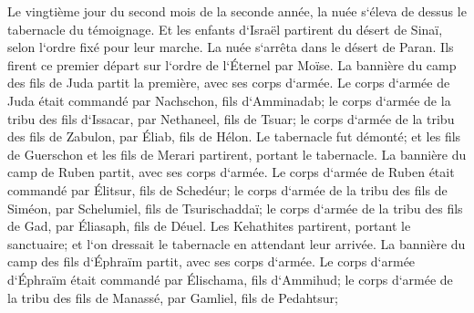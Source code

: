 \verse Le vingtième jour du second mois de la seconde année, la nuée s`éleva de dessus le tabernacle du témoignage. 
\verse Et les enfants d`Israël partirent du désert de Sinaï, selon l`ordre fixé pour leur marche. La nuée s`arrêta dans le désert de Paran. 
\verse Ils firent ce premier départ sur l`ordre de l`Éternel par Moïse. 
\verse La bannière du camp des fils de Juda partit la première, avec ses corps d`armée. Le corps d`armée de Juda était commandé par Nachschon, fils d`Amminadab; 
\verse le corps d`armée de la tribu des fils d`Issacar, par Nethaneel, fils de Tsuar; 
\verse le corps d`armée de la tribu des fils de Zabulon, par Éliab, fils de Hélon. 
\verse Le tabernacle fut démonté; et les fils de Guerschon et les fils de Merari partirent, portant le tabernacle. 
\verse La bannière du camp de Ruben partit, avec ses corps d`armée. Le corps d`armée de Ruben était commandé par Élitsur, fils de Schedéur; 
\verse le corps d`armée de la tribu des fils de Siméon, par Schelumiel, fils de Tsurischaddaï; 
\verse le corps d`armée de la tribu des fils de Gad, par Éliasaph, fils de Déuel. 
\verse Les Kehathites partirent, portant le sanctuaire; et l`on dressait le tabernacle en attendant leur arrivée. 
\verse La bannière du camp des fils d`Éphraïm partit, avec ses corps d`armée. Le corps d`armée d`Éphraïm était commandé par Élischama, fils d`Ammihud; 
\verse le corps d`armée de la tribu des fils de Manassé, par Gamliel, fils de Pedahtsur; 
